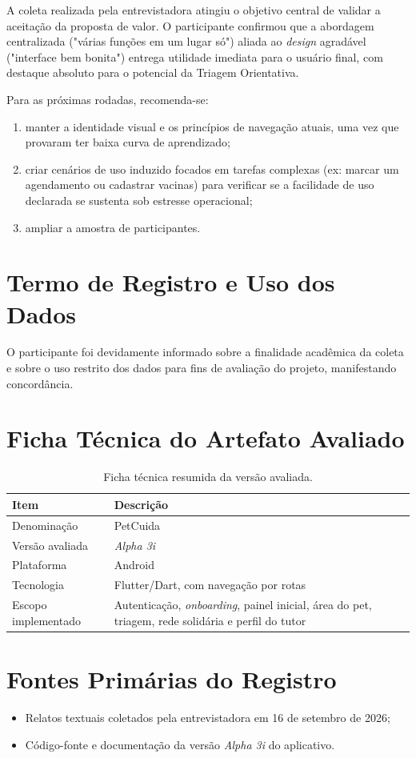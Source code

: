 \documentclass[12pt,a4paper]{article}
\begin{document}
A coleta realizada pela entrevistadora atingiu o objetivo central de validar a aceitação da proposta de valor. O participante confirmou que a abordagem centralizada ("várias funções em um lugar só") aliada ao \textit{design} agradável ("interface bem bonita") entrega utilidade imediata para o usuário final, com destaque absoluto para o potencial da Triagem Orientativa.

Para as próximas rodadas, recomenda-se:

\begin{enumerate}[label=\textbf{R\arabic*.},leftmargin=1.6cm]
  \item manter a identidade visual e os princípios de navegação atuais, uma vez que provaram ter baixa curva de aprendizado;
  \item criar cenários de uso induzido focados em tarefas complexas (ex: marcar um agendamento ou cadastrar vacinas) para verificar se a facilidade de uso declarada se sustenta sob estresse operacional;
  \item ampliar a amostra de participantes.
\end{enumerate}

\appendix
\section{Termo de Registro e Uso dos Dados}

O participante foi devidamente informado sobre a finalidade acadêmica da coleta e sobre o uso restrito dos dados para fins de avaliação do projeto, manifestando concordância.

\section{Ficha Técnica do Artefato Avaliado}

\begin{table}[h!]
\centering
\small
\begin{tabular}{@{}>{\raggedright\arraybackslash}p{4.6cm}>{\raggedright\arraybackslash}p{9.0cm}@{}}
\toprule
\textbf{Item} & \textbf{Descrição} \\
\midrule
Denominação & PetCuida \\
Versão avaliada & \textit{Alpha 3i} \\
Plataforma & Android \\
Tecnologia & Flutter/Dart, com navegação por rotas \\
Escopo implementado & Autenticação, \textit{onboarding}, painel inicial, área do pet, triagem, rede solidária e perfil do tutor \\
\bottomrule
\end{tabular}
\caption{Ficha técnica resumida da versão avaliada.}
\end{table}

\section{Fontes Primárias do Registro}

\begin{itemize}[leftmargin=*]
  \item Relatos textuais coletados pela entrevistadora em 16 de setembro de 2026;
  \item Código-fonte e documentação da versão \textit{Alpha 3i} do aplicativo.
\end{itemize}
\end{document}
